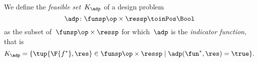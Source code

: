



\begin{comment}
\todotext{not sure we need example here anyway}
\begin{example}
  Imagine a truck to be driving at constant speed on a straight street.
  If it can cover \unit[100]{km} with \unit[10]{L} of gasoline, it can also cover \unit[80]{km} with it.
  Furthermore, it will be able to cover the \unit[100]{km} also with \unit[10]{L} of gasoline.
\end{example}

%
\end{comment}


\begin{definition}
  \label{def:dp-feasible-set}
  We define the \emph{feasible set}~$K_\adp$ of a design problem~
  \begin{equation}\label{eq:generic-design-prob}
\adp\colon \funsp\op \times \ressp\toinPos \Bool
\end{equation}
 as the subset of~$\funsp \op\times \ressp$ for which~$\adp$ is the \emph{indicator function}, that is%
  \begin{equation}\label{eq:design-prob-as-upper-set}
    K_\adp = \{ \tup{\F{f^*},\res} \in \funsp \op\times \ressp  \mid %
    \adp(\fun^*, \res) = \true %
    \}.
  \end{equation}
\end{definition}


